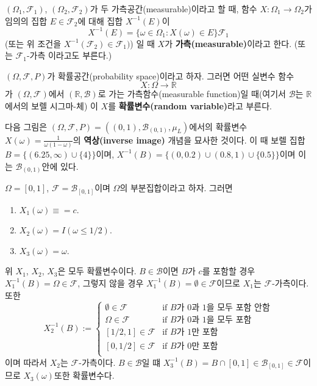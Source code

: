 \documentclass[b5paper,]{scrbook}
\theoremstyle{plain}
\theoremstyle{definition}
\numberwithin{equation}{section}
\let\BeginKnitrBlock\begin \let\EndKnitrBlock\end
\begin{document}
\BeginKnitrBlock{definition}[가측]
\protect\hypertarget{def:unnamed-chunk-67}{}{\label{def:unnamed-chunk-67}
{} }\((\Omega_{1}, \mathcal{F}_{1})\),
\((\Omega_{2}, \mathcal{F}_{2})\)가 두 가측공간(measurable)이라고 할 때,
함수 \(X:\Omega_{1} \rightarrow \Omega_{2}\)가 임의의 집합
\(E\in \mathcal{F}_{2}\)에 대해 집합 \(X^{-1}(E)\)이
\[X^{-1}(E)=\{ \omega \in \Omega_{1}: X(\omega) \in E\} \mathcal{F}_{1}\]
(또는 위 조건을 \(X^{-1}(\mathcal{F}_{2})\in \mathcal{F}_{1})\)) 일 때
\(X\)가 \textbf{가측(measurable)}이라고 한다. (또는
\(\mathcal{F}_{1}\)-가측 이라고도 부른다.)
\EndKnitrBlock{definition}

\BeginKnitrBlock{definition}[확률변수]
\protect\hypertarget{def:unnamed-chunk-68}{}{\label{def:unnamed-chunk-68}
{} }\((\Omega, \mathcal{F}, P)\)가
확률공간(probability space)이라고 하자. 그러면 어떤 실변수 함수
\[X:\Omega \rightarrow \mathbb{R}\] 가 \((\Omega, \mathcal{F})\)에서
\((\mathbb{R}, \mathcal{B})\)로 가는 가측함수(measurable function)일
때(여기서 \(\mathcal{B}\)는 \(\mathbb{R}\)에서의 보렐 시그마-체) 이
\(X\)를 \textbf{확률변수(random variable)}라고 부른다.
\EndKnitrBlock{definition}

다음 그림은
\((\Omega, \mathcal{F}, P)= ((0,1), \mathcal{B}_{(0,1)}, \mu_{L})\)에서의
확률변수 \(X(\omega) = \frac{1}{\omega(1-\omega)}\)의
\textbf{역상(inverse image)} 개념을 묘사한 것이다. 이 때 보렐 집합
\(B=\{ (6.25, \infty)\cup \{4\} \}\)이며,
\(X^{-1}(B)=\{ (0,0.2)\cup (0.8,1)\cup \{0.5\} \}\)이며 이는
\(\mathcal{B}_{(0,1)}\)안에 있다.

\BeginKnitrBlock{example}[확률변수의 예]
\protect\hypertarget{exm:unnamed-chunk-69}{}{\label{exm:unnamed-chunk-69}
{} }\(\Omega=[0,1]\),
\(\mathcal{F}=\mathcal{B}_{[0,1]}\)이며 \(\Omega\)의 부분집합이라고
하자. 그러면

\begin{enumerate}
\def\labelenumi{\arabic{enumi}.}
\item
  \(X_{1}(\omega)\equiv=c\).
\item
  \(X_{2}(\omega)=I(\omega \leq 1/2)\).
\item
  \(X_{3}(\omega) = \omega\).
\end{enumerate}

위 \(X_{1}\), \(X_{2}\), \(X_{3}\)은 모두 확률변수이다.
\(B\in\mathcal{B}\)이면 \(B\)가 \(c\)를 포함할 경우
\(X_{1}^{-1}(B)=\Omega\in\mathcal{F}\), 그렇지 않을 경우
\(X_{1}^{-1}(B)=\emptyset\in\mathcal{F}\)이므로 \(X_{1}\)는
\(\mathcal{F}\)-가측이다. 또한 \[
X_{2}^{-1}(B) := 
\begin{cases}
\emptyset\in\mathcal{F} & \text{if $B$가 0과 1을 모두 포함 안함} \\
\Omega\in\mathcal{F} & \text{if $B$가 0과 1을 모두 포함} \\
[1/2,1]\in\mathcal{F} & \text{if $B$가 1만 포함} \\
[0,1/2]\in\mathcal{F} & \text{if $B$가 0만 포함} \\
\end{cases}
\] 이며 따라서 \(X_{2}\)는 \(\mathcal{F}\)-가측이다.
\(B\in\mathcal{B}\)일 떄
\(X_{3}^{-1}(B)=B\cap [0,1] \in \mathcal{B}_{[0,1]}\in\mathcal{F}\)이므로
\(X_{3}(\omega)\)또한 확률변수다.
\EndKnitrBlock{example}
\end{document}
